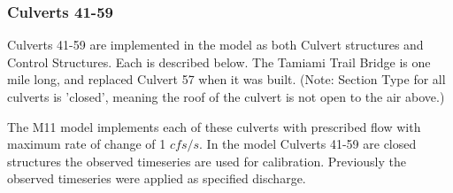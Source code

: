 %
%


\clearpage
\subsubsection{Culverts 41-59}

Culverts 41-59 are implemented in the model as both Culvert structures and Control Structures. Each is described below. The Tamiami Trail Bridge is one mile long, and replaced Culvert 57 when it was built. (Note: Section Type for all culverts is 'closed', meaning the roof of the culvert is not open to the air above.)

The M11 model implements each of these culverts with prescribed flow with maximum rate of change of 1 $cfs/s$. In the model Culverts 41-59 are closed structures the observed timeseries are used for calibration. Previously the observed timeseries were applied as specified discharge.


